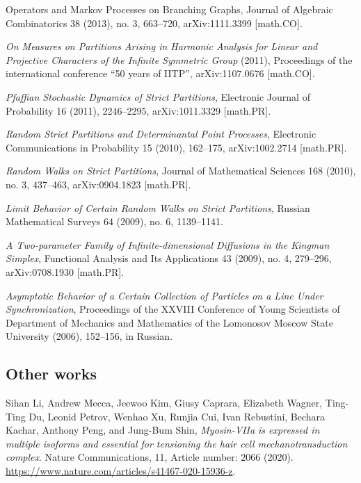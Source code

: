\documentclass[letterpaper,11pt]{article}
\begin{document}
\begin{etaremune}
{		      Operators and Markov Processes on Branching Graphs},
	      Journal of Algebraic Combinatorics 38 (2013), no. 3, 663--720,
	      arXiv:1111.3399 [math.CO].
	\item
	      \emph{On Measures on Partitions Arising in Harmonic Analysis for
		      Linear and Projective Characters of the Infinite Symmetric Group} (2011),
	      Proceedings of the international conference ``50 years of
	      IITP'', arXiv:1107.0676 [math.CO].
	\item
	      \emph{Pfaffian Stochastic Dynamics of Strict Partitions},
	      Electronic Journal of Probability 16 (2011), 2246--2295,
	      arXiv:1011.3329 [math.PR].
	\item
	      \emph{Random Strict Partitions and Determinantal Point
		      Processes},
	      Electronic Communications in Probability 15 (2010), 162--175,
	      arXiv:1002.2714 [math.PR].
	\item
	      \emph{Random Walks on Strict Partitions}, Journal of
	      Mathematical Sciences 168 (2010), no. 3, 437--463,
	      arXiv:0904.1823 [math.PR].
	\item
	      \emph{Limit Behavior of Certain Random Walks on Strict
		      Partitions},
	      Russian Mathematical Surveys 64 (2009), no. 6, 1139--1141.
	\item
	      \emph{A Two-parameter Family of Infinite-dimensional Diffusions
		      in the Kingman Simplex}, Functional Analysis and Its
	      Applications 43 (2009), no. 4, 279--296, arXiv:0708.1930
	      [math.PR].
	\item
	      \emph{Asymptotic Behavior of a Certain Collection of Particles
		      on a Line Under Synchronization}, Proceedings of the XXVIII
	      Conference of Young Scientists of Department of Mechanics and
	      Mathematics of the Lomonosov Moscow State University (2006), 152--156, in
	      Russian.
\end{etaremune}

\subsection*{Other works}

\begin{etaremune}
	\renewcommand{\labelenumi}{[\theenumi]}
	\item
	Sihan Li, Andrew Mecca, Jeewoo Kim, Giusy Caprara, Elizabeth Wagner, Ting-Ting Du, Leonid Petrov, Wenhao Xu, Runjia Cui, Ivan Rebustini, Bechara Kachar, Anthony Peng, and Jung-Bum Shin,
	\emph{Myosin-VIIa is expressed in multiple isoforms and essential for tensioning the hair cell mechanotransduction complex}.
	Nature Communications, 11, Article number: 2066 (2020). \url{https://www.nature.com/articles/s41467-020-15936-z}.
\end{etaremune}
\end{document}
